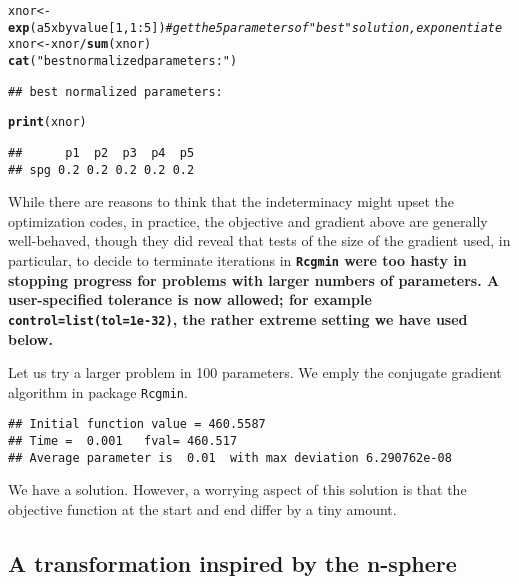 \documentclass[11pt]{article}\usepackage[]{graphicx}\usepackage[]{color}
\makeatletter
\newcommand{\hlnum}[1]{\textcolor[rgb]{0.686,0.059,0.569}{#1}}%
\newcommand{\hlstr}[1]{\textcolor[rgb]{0.192,0.494,0.8}{#1}}%
\newcommand{\hlcom}[1]{\textcolor[rgb]{0.678,0.584,0.686}{\textit{#1}}}%
\newcommand{\hlopt}[1]{\textcolor[rgb]{0,0,0}{#1}}%
\newcommand{\hlstd}[1]{\textcolor[rgb]{0.345,0.345,0.345}{#1}}%
\newcommand{\hlkwb}[1]{\textcolor[rgb]{0.69,0.353,0.396}{#1}}%
\newcommand{\hlkwd}[1]{\textcolor[rgb]{0.737,0.353,0.396}{\textbf{#1}}}%
\newenvironment{kframe}{%
 \def\at@end@of@kframe{}%
 \ifinner\ifhmode%
  \def\at@end@of@kframe{\end{minipage}}%
  \begin{minipage}{\columnwidth}%
 \fi\fi%
 \def\FrameCommand##1{\hskip\@totalleftmargin \hskip-\fboxsep
 \colorbox{shadecolor}{##1}\hskip-\fboxsep
     \hskip-\linewidth \hskip-\@totalleftmargin \hskip\columnwidth}%
 \MakeFramed {\advance\hsize-\width
   \@totalleftmargin\z@ \linewidth\hsize
   \@setminipage}}%
 {\par\unskip\endMakeFramed%
 \at@end@of@kframe}
\newenvironment{knitrout}{}{} %
\newcommand{\code}[1]{{\tt#1}}
\newcommand{\pkg}[1]{\bf{\tt#1}\rm }
\makeatother
\begin{document}
\begin{knitrout}
\begin{kframe}
\begin{alltt}
\hlstd{xnor}\hlkwb{<-}\hlkwd{exp}\hlstd{(a5xbyvalue[}\hlnum{1}\hlstd{,} \hlnum{1}\hlopt{:}\hlnum{5}\hlstd{])} \hlcom{# get the 5 parameters of "best" solution, exponentiate}
\hlstd{xnor}\hlkwb{<-}\hlstd{xnor}\hlopt{/}\hlkwd{sum}\hlstd{(xnor)}
\hlkwd{cat}\hlstd{(}\hlstr{"best normalized parameters:"}\hlstd{)}
\end{alltt}
\begin{verbatim}
## best normalized parameters:
\end{verbatim}
\begin{alltt}
\hlkwd{print}\hlstd{(xnor)}
\end{alltt}
\begin{verbatim}
##      p1  p2  p3  p4  p5
## spg 0.2 0.2 0.2 0.2 0.2
\end{verbatim}
\end{kframe}
\end{knitrout}


While there are reasons to think that the indeterminacy
might upset the optimization codes, in practice, the objective 
and gradient above are generally
well-behaved, though they did reveal that tests of the size 
of the gradient used, in particular, to
decide to terminate iterations in \pkg{Rcgmin} were too 
hasty in stopping progress for problems
with larger numbers of parameters. A user-specified tolerance is now allowed; for
example \code{control=list(tol=1e-32)}, the rather extreme setting we have used
below. 

Let us try a larger problem in 100 parameters. We emply the conjugate gradient
algorithm in package \code{Rcgmin}.

\begin{knitrout}\scriptsize
{}\color{fgcolor}\begin{kframe}
\begin{verbatim}
## Initial function value = 460.5587
## Time =  0.001   fval= 460.517
## Average parameter is  0.01  with max deviation 6.290762e-08
\end{verbatim}
\end{kframe}
\end{knitrout}

We have a solution. However, a worrying aspect of this 
solution is that the objective function 
at the start and end differ by a tiny amount. 

\subsection{A transformation inspired by the n-sphere}
\end{document}
